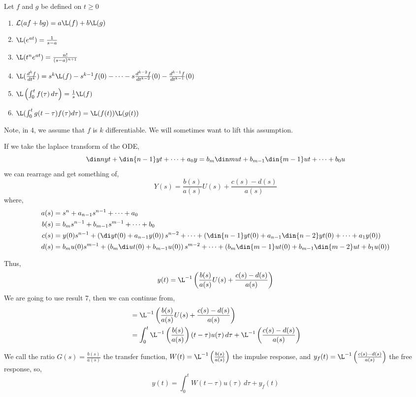 Let $f$ and $g$ be defined on $t \ge 0$
\begin{enumerate}
  \item $\mathcal{L}(af + bg) = a\L(f) + b\L(g)$
  \item $\L(e^{at}) = \frac{1}{s - a}$
  \item $\L(t^ne^{at}) = \frac{n!}{(s - a)^{n+1}}$
  \item $\L(\frac{d^k f}{dt^k}) = s^k \L(f) - s^{k-1}f(0) - \dots - s\frac{d^{k-2}f}{dt^{k-2}}(0) - \frac{d^{k-1}f}{dt^{k-1}}(0)$
  \item $\L\left( \int_0^t f(\tau)\,d\tau\right) = \frac{1}{s}\L(f)$
  \item $\L(\int_0^t g(t - \tau)f(\tau)d\tau) = \L(f(t))\L(g(t))$
\end{enumerate}
Note, in $4$, we assume that $f$ is $k$ differentiable. We will sometimes want to lift this assumption.

If we take the laplace transform of the ODE,
$$ \din n y t + \din {n-1} y t + \dots + a_0y = b_m\din m u t + b_{m-1}\din {m-1} u t + \dots + b_0u$$
we can rearrage and get something of,
$$ Y(s) = \frac{b(s)}{a(s)}U(s) + \frac{c(s) - d(s)}{a(s)} $$
where,
\begin{align*}
  a(s) &= s^n + a_{n-1}s^{n-1} + \dots + a_0\\
  b(s) &= b_m s^{n-1} + b_{m-1}s^{m-1} + \dots + b_0\\
  c(s) &= y(0)s^{n-1} + \left( \di y t (0) + a_{n-1}y(0) \right)s^{n-2} + \dots + \left( \din {n-1} y t (0) + a_{n-1}\din {n-2} y t (0) + \dots + a_1y(0) \right)\\
  d(s) &= b_m u(0)s^{m-1} + \left( b_m \di u t (0) + b_{m-1}u(0) \right)s^{m-2} + \dots + \left( b_m \din {m-1} u t (0) + b_{m-1}\din {m-2} u t + b_1u(0) \right)
\end{align*}

Thus,
$$ y(t) = \L^{-1}\left( \frac{b(s)}{a(s)}U(s) + \frac{c(s) - d(s)}{a(s)} \right) $$
We are going to use result 7, then we can continue from,
\begin{align*}
  &= \L^{-1}\left( \frac{b(s)}{a(s)}U(s) + \frac{c(s) - d(s)}{a(s)} \right)\\
  &= \int_0^t \L^{-1}\left( \frac{b(s)}{a(s)}\right)(t - \tau)u(\tau)\,d\tau + \L^{-1}\left(\frac{c(s) - d(s)}{a(s)} \right)
\end{align*}

We call the ratio $G(s) = \frac{b(s)}{a(s)}$ the transfer function, $W(t) = \L^{-1}\left( \frac{b(s)}{a(s)} \right)$ the impulse response, and $y_f(t) = \L^{-1}\left( \frac{c(s) - d(s)}{a(s)} \right)$ the free response, so,
$$ y(t) = \int^t_0 W(t - \tau)u(\tau) \,d\tau + y_f(t) $$


